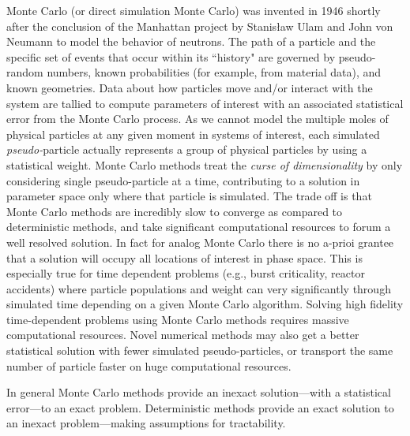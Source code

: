 Monte Carlo (or direct simulation Monte Carlo) was invented in 1946 shortly after the conclusion of the Manhattan project by Stanisław Ulam and John von Neumann to model the behavior of neutrons.
The path of a particle and the specific set of events that occur within its ``history" are governed by pseudo-random numbers, known probabilities (for example, from material data), and known geometries.
Data about how particles move and/or interact with the system are tallied to compute parameters of interest with an associated statistical error from the Monte Carlo process.
As we cannot model the multiple moles of physical particles at any given moment in systems of interest, each simulated \textit{pseudo-}particle actually represents a group of physical particles by using a statistical weight.
Monte Carlo methods treat the \textit{curse of dimensionality} by only considering single pseudo-particle at a time, contributing to a solution in parameter space only where that particle is simulated.
The trade off is that Monte Carlo methods are incredibly slow to converge as compared to deterministic methods, and take significant computational resources to forum a well resolved solution.
In fact for analog Monte Carlo there is no a-prioi grantee that a solution will occupy all locations of interest in phase space.
This is especially true for time dependent problems (e.g., burst criticality, reactor accidents) where particle populations and weight can very significantly through simulated time depending on a given Monte Carlo algorithm.
Solving high fidelity time-dependent problems using Monte Carlo methods requires massive computational resources.
Novel numerical methods may also get a better statistical solution with fewer simulated pseudo-particles, or transport the same number of particle faster on huge computational resources.

In general Monte Carlo methods provide an inexact solution---with a statistical error---to an exact problem. Deterministic methods provide an exact solution to an inexact problem---making assumptions for tractability.

